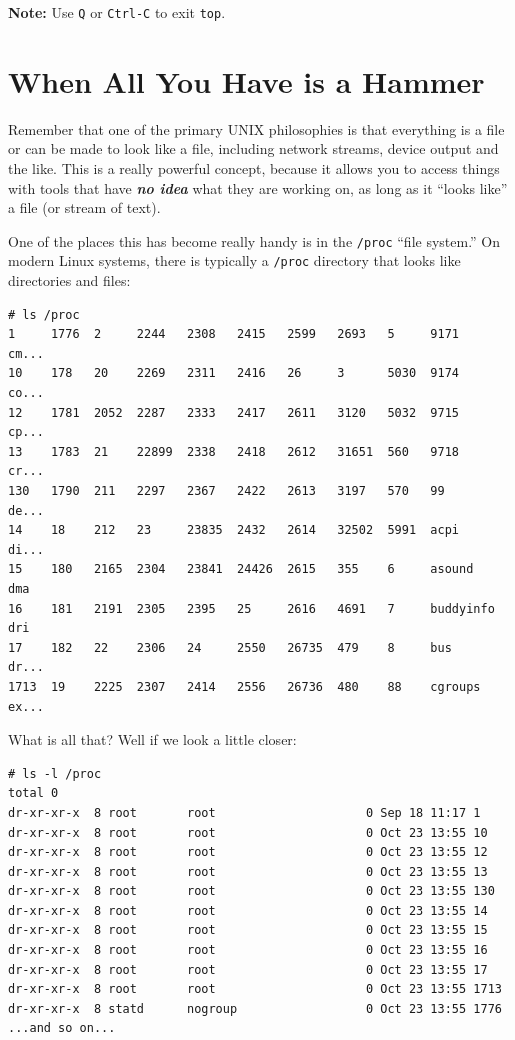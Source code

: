 \documentclass[10pt,]{book}
\numberwithin{figure}{chapter}
\begin{document}
\textbf{Note:} Use \texttt{Q} or \texttt{Ctrl-C} to exit \texttt{top}.

\section{When All You Have is a
Hammer}\label{when-all-you-have-is-a-hammer}

Remember that one of the primary UNIX philosophies is that everything is
a file or can be made to look like a file, including network streams,
device output and the like. This is a really powerful concept, because
it allows you to access things with tools that have \textbf{\emph{no
idea}} what they are working on, as long as it ``looks like'' a file (or
stream of text).

One of the places this has become really handy is in the \texttt{/proc}
``file system.'' On modern Linux systems, there is typically a
\texttt{/proc} directory that looks like directories and files:

\begin{verbatim}
# ls /proc
1     1776  2     2244   2308   2415   2599   2693   5     9171       cm...
10    178   20    2269   2311   2416   26     3      5030  9174       co...
12    1781  2052  2287   2333   2417   2611   3120   5032  9715       cp...
13    1783  21    22899  2338   2418   2612   31651  560   9718       cr...
130   1790  211   2297   2367   2422   2613   3197   570   99         de...
14    18    212   23     23835  2432   2614   32502  5991  acpi       di...
15    180   2165  2304   23841  24426  2615   355    6     asound     dma
16    181   2191  2305   2395   25     2616   4691   7     buddyinfo  dri
17    182   22    2306   24     2550   26735  479    8     bus        dr...
1713  19    2225  2307   2414   2556   26736  480    88    cgroups    ex...
\end{verbatim}

What is all that? Well if we look a little closer:

\begin{verbatim}
# ls -l /proc
total 0
dr-xr-xr-x  8 root       root                     0 Sep 18 11:17 1
dr-xr-xr-x  8 root       root                     0 Oct 23 13:55 10
dr-xr-xr-x  8 root       root                     0 Oct 23 13:55 12
dr-xr-xr-x  8 root       root                     0 Oct 23 13:55 13
dr-xr-xr-x  8 root       root                     0 Oct 23 13:55 130
dr-xr-xr-x  8 root       root                     0 Oct 23 13:55 14
dr-xr-xr-x  8 root       root                     0 Oct 23 13:55 15
dr-xr-xr-x  8 root       root                     0 Oct 23 13:55 16
dr-xr-xr-x  8 root       root                     0 Oct 23 13:55 17
dr-xr-xr-x  8 root       root                     0 Oct 23 13:55 1713
dr-xr-xr-x  8 statd      nogroup                  0 Oct 23 13:55 1776
...and so on...
\end{verbatim}
\end{document}
